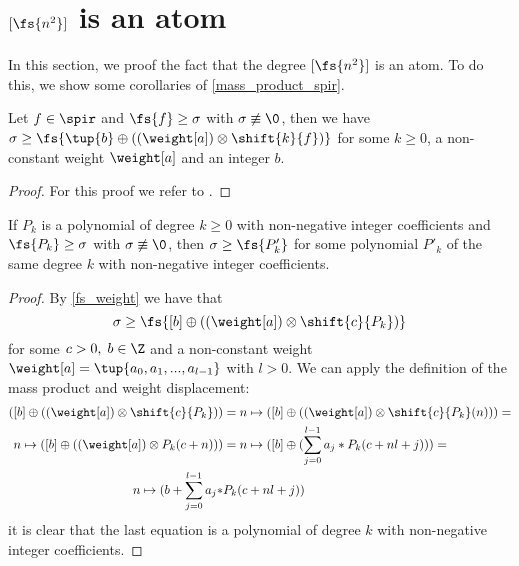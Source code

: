 \section{$[\fs{n^2}]$ is an atom}
In this section, we proof the fact that the degree $[\fs{n^2}]$ is an atom. To do this, we show some corollaries of \cref{mass_product_spir}.

\begin{corollary}\label{fs_weight}
	Let $f\in\spir$ and $\fs{f} \geq \sigma$ with $\sigma \not\equiv \0$, then we have $\sigma \geq \fs{\tup{b} \oplus ((\weight[a]) \otimes \shift{k}{f})}$ for some $k\geq 0$, a non-constant weight $\weight[a]$ and an integer $b$.
	\begin{proof}
		 For this proof we refer to \cite{streams:degrees:squares:2015}. 
	\end{proof}
\end{corollary}

\begin{proposition}\label{poly_trans}
	If $P_k$ is a polynomial of degree $k\geq 0$ with non-negative integer coefficients and $\fs{P_k} \geq \sigma$ with $\sigma \not\equiv \0$, then $\sigma \geq \fs{P'_k}$ for some polynomial $P'_k$ of the same degree $k$ with non-negative integer coefficients.
	\begin{proof}
		By \cref{fs_weight} we have that 
		$$\sigma \geq \fs{[b]\oplus((\weight[a])\otimes\shift{c}{P_k})}$$
		for some $c>0,\; b\in\Z$ and a non-constant weight $\weight[a] = \tup{a_0,a_1,...,a_{l-1}}$ with $l > 0$. We can apply the definition of the mass product and weight displacement:
		\begin{align*}
			([b] \oplus ((\weight[a]) \otimes \shift{c}{P_k})) &=
			n \mapsto ([b] \oplus ((\weight[a]) \otimes \shift{c}{P_k}(n))) = \\
			n \mapsto ([b] \oplus ((\weight[a]) \otimes P_k(c+n))) &= 
			n \mapsto ([b] \oplus (\sum_{j=0}^{l-1}a_j*P_k(c+nl+j))) = \\
			n \mapsto (b + \sum_{j=0}^{l-1}a_j*&P_k(c+nl+j))
		\end{align*}
		it is clear that the last equation is a polynomial of degree $k$ with non-negative integer coefficients.
	\end{proof}
\end{proposition}

